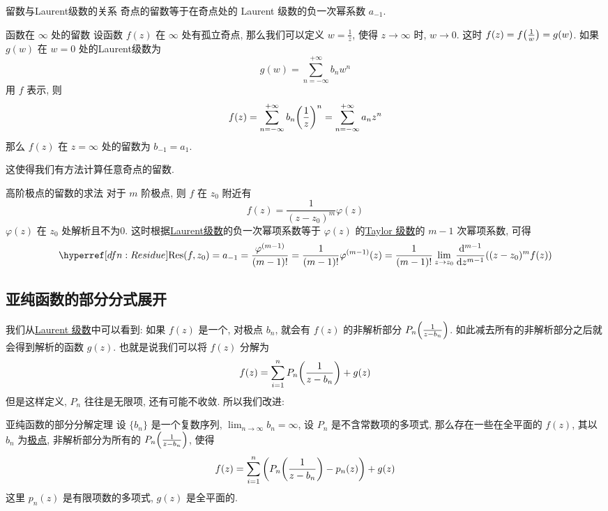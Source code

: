        \begin{thm}
            {留数与Laurent级数的关系}
            奇点的留数等于在奇点处的 Laurent 级数的负一次幂系数 \(a_{-1}\).
        \end{thm}

        \begin{xmp}
            {函数在 \(\infty\) 处的留数}
            设函数 \(f(z)\) 在 \(\infty\) 处有孤立奇点, 那么我们可以定义 \(w=\frac{1}{z}\), 使得 \(z\to\infty\) 时, \(w\to 0\). 这时 \(f(z)=f\qty(\frac{1}{w})=g(w)\). 如果 \(g(w)\) 在 \(w=0\) 处的Laurent级数为
            \[g(w)=\sum_{n=-\infty}^{+\infty}b_nw^n\]
            用 \(f\) 表示, 则
            \[f(z)=\sum_{n=-\infty}^{+\infty}b_n\qty(\frac{1}{z})^n=\sum_{n=-\infty}^{+\infty}a_nz^n\]
            那么 \(f(z)\) 在 \(z=\infty\) 处的留数为 \(b_{-1}=a_1\).
        \end{xmp}

        这使得我们有方法计算任意奇点的留数. 

        \begin{crl}
            {高阶极点的留数的求法}
            对于 \(m\) 阶极点, 则 \(f\) 在 \(z_0\) 附近有
            \[f(z)=\frac{1}{(z-z_0)^m}\varphi(z)\]
            \(\varphi(z)\) 在 \(z_0\) 处解析且不为0. 这时根据\hyperref[thm:Laurent-Series]{Laurent级数}的负一次幂项系数等于 \(\varphi(z)\) 的\hyperref[thm:Taylor]{Taylor 级数}的 \(m-1\) 次幂项系数, 可得
            \[\Res(f,z_0)=a_{-1}=\frac{\varphi^{(m-1)}}{(m-1)!}=\frac{1}{(m-1)!}\varphi^{(m-1)}(z)=\frac{1}{(m-1)!}\lim_{z\to z_0}\dv[m-1]{z}((z-z_0)^mf(z))\]
        \end{crl}
    
    \subsection{亚纯函数的部分分式展开}

        我们从\hyperref[thm:Laurent-Series]{Laurent 级数}中可以看到: 如果 \(f(z)\) 是一个\Meromorphic{}, 对极点 \(b_n\), 就会有 \(f(z)\) 的非解析部分 \(P_n\qty(\frac{1}{z-b_n})\). 如此减去所有的非解析部分之后就会得到解析的函数 \(g(z)\). 也就是说我们可以将 \(f(z)\) 分解为
        \[f(z)=\sum_{i=1}^{n}P_n\qty(\frac{1}{z-b_n})+g(z)\]
        但是这样定义,  \(P_n\) 往往是无限项, 还有可能不收敛. 所以我们改进: 

        \begin{thm}
            {亚纯函数的部分分解定理}
            设 \(\{b_n\}\) 是一个复数序列,  \(\lim_{n\to\infty }b_n=\infty\), 设 \(P_n\) 是不含常数项的多项式, 那么存在一些在全平面的\Meromorphic{} \(f(z)\), 其以 \(b_n\) 为\hyperref[dfn:Pole]{极点}, 非解析部分为所有的 \(P_n\qty(\frac{1}{z-b_n})\), 使得
            \[f(z)=\sum_{i=1}^{n}\pqty{P_n\pqty{\frac{1}{z-b_n}}-p_n(z)}+g(z)\]
            这里 \(p_n(z)\) 是有限项数的多项式,  \(g(z)\) 是全平面的\Analytic{}. 
        \end{thm}

